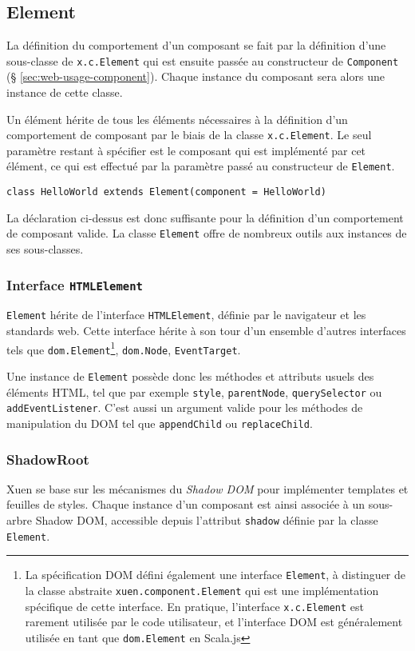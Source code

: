 \subsection{Element}

La définition du comportement d'un composant se fait par la définition d'une sous-classe de \texttt{x.c.Element} qui est ensuite passée au constructeur de \texttt{Component} (§ \ref{sec:web-usage-component}). Chaque instance du composant sera alors une instance de cette classe.

Un élément hérite de tous les éléments nécessaires à la définition d'un comportement de composant par le biais de la classe \texttt{x.c.Element}. Le seul paramètre restant à spécifier est le composant qui est implémenté par cet élément, ce qui est effectué par la paramètre passé au constructeur de \texttt{Element}.
\begin{lstlisting}
class HelloWorld extends Element(component = HelloWorld)
\end{lstlisting}

La déclaration ci-dessus est donc suffisante pour la définition d'un comportement de composant valide. La classe \texttt{Element} offre de nombreux outils aux instances de ses sous-classes.

\subsubsection{Interface \texttt{HTMLElement}}
\texttt{Element} hérite de l'interface \texttt{HTMLElement}, définie par le navigateur et les standards web. Cette interface hérite à son tour d'un ensemble d'autres interfaces tels que \texttt{dom.Element}\footnote{La spécification DOM défini également une interface \texttt{Element}, à distinguer de la classe abstraite \texttt{xuen.component.Element} qui est une implémentation spécifique de cette interface. En pratique, l'interface \texttt{x.c.Element} est rarement utilisée par le code utilisateur, et l'interface DOM est généralement utilisée en tant que \texttt{dom.Element} en Scala.js}, \texttt{dom.Node}, \texttt{EventTarget}.

Une instance de \texttt{Element} possède donc les méthodes et attributs usuels des éléments HTML, tel que par exemple \texttt{style}, \texttt{parentNode}, \texttt{querySelector} ou \texttt{addEventListener}. C'est aussi un argument valide pour les méthodes de manipulation du DOM tel que \texttt{appendChild} ou \texttt{replaceChild}.

\subsubsection{ShadowRoot}
Xuen se base sur les mécanismes du \emph{Shadow DOM} pour implémenter templates et feuilles de styles. Chaque instance d'un composant est ainsi associée à un sous-arbre Shadow DOM, accessible depuis l'attribut \texttt{shadow} définie par la classe \texttt{Element}.

